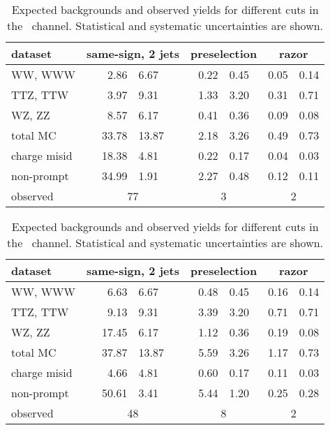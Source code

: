 
        \begin{table}[htb]
            \centering
            \begin{tabular}{l *3{r@{$\pm$}l}}
                
\toprule
dataset & \multicolumn{2}{c}{same-sign, 2 jets}& \multicolumn{2}{c}{preselection}& \multicolumn{2}{c}{razor} \\
\midrule
WW, WWW& 2.86 & 6.67& 0.22 & 0.45& 0.05 & 0.14\\
TTZ, TTW& 3.97 & 9.31& 1.33 & 3.20& 0.31 & 0.71\\
WZ, ZZ& 8.57 & 6.17& 0.41 & 0.36& 0.09 & 0.08\\
\midrule
total MC& 33.78 & 13.87& 2.18 & 3.26& 0.49 & 0.73\\
charge misid& 18.38 & 4.81& 0.22 & 0.17& 0.04 & 0.03\\
non-prompt & 34.99 & 1.91& 2.27 & 0.48& 0.12 & 0.11\\
observed & \multicolumn{2}{c}{77}& \multicolumn{2}{c}{3}& \multicolumn{2}{c}{2} \\
\bottomrule

            \end{tabular}
            \caption{Expected backgrounds and observed yields for different
            cuts in the \E\E\ channel. Statistical and systematic uncertainties are
            shown.}
            \label{tab:background_yields}
        \end{table}

        \begin{table}[htb]
            \centering
            \begin{tabular}{l *3{r@{$\pm$}l}}
                
\toprule
dataset & \multicolumn{2}{c}{same-sign, 2 jets}& \multicolumn{2}{c}{preselection}& \multicolumn{2}{c}{razor} \\
\midrule
WW, WWW& 6.63 & 6.67& 0.48 & 0.45& 0.16 & 0.14\\
TTZ, TTW& 9.13 & 9.31& 3.39 & 3.20& 0.71 & 0.71\\
WZ, ZZ& 17.45 & 6.17& 1.12 & 0.36& 0.19 & 0.08\\
\midrule
total MC& 37.87 & 13.87& 5.59 & 3.26& 1.17 & 0.73\\
charge misid& 4.66 & 4.81& 0.60 & 0.17& 0.11 & 0.03\\
non-prompt & 50.61 & 3.41& 5.44 & 1.20& 0.25 & 0.28\\
observed & \multicolumn{2}{c}{48}& \multicolumn{2}{c}{8}& \multicolumn{2}{c}{2} \\
\bottomrule

            \end{tabular}
            \caption{Expected backgrounds and observed yields for different
            cuts in the \E\M\ channel. Statistical and systematic uncertainties are
            shown.}
            \label{tab:background_yields}
        \end{table}

